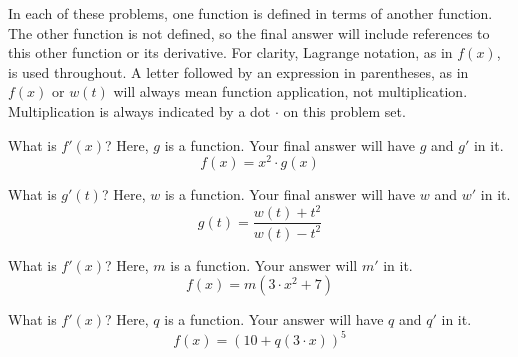 
In each of these problems, one function is defined in terms of another function.
The other function is not defined, so the final answer will include references to this other function or its derivative.
For clarity, Lagrange notation, as in $f(x)$, is used throughout.
A letter followed by an expression in parentheses, as in $f(x)$ or $w(t)$ will always mean function application, not multiplication.
Multiplication is always indicated by a dot $\cdot$ on this problem set.

\begin{ProblemSet}[pencil space=2.5in]

 \begin{Problem}
  What is $f'(x)$?
  Here, $g$ is a function.
  Your final answer will have $g$ and $g'$ in it.
  \begin{equation*}
   f(x) = x^2 \cdot g(x)
  \end{equation*}
 \end{Problem}

 \begin{Problem}[pencil space=3in]
  What is $g'(t)$?
  Here, $w$ is a function.
  Your final answer will have $w$ and $w'$ in it.
  \begin{equation*}
   g(t) = \frac{w(t) + t^2}{w(t) - t^2}
  \end{equation*}
 \end{Problem}

 \begin{Problem}
  What is $f'(x)$?
  Here, $m$ is a function.
  Your answer will $m'$ in it.
  \begin{equation*}
   f(x) = m\!\left(3\cdot x^2 + 7\right)
  \end{equation*}
 \end{Problem}

 \begin{Problem}
  What is $f'(x)$?
  Here, $q$ is a function.
  Your answer will have $q$ and $q'$ in it.
  \begin{equation*}
   f(x) = (10 + q(3\cdot x))^5
  \end{equation*}
 \end{Problem}

\end{ProblemSet}


